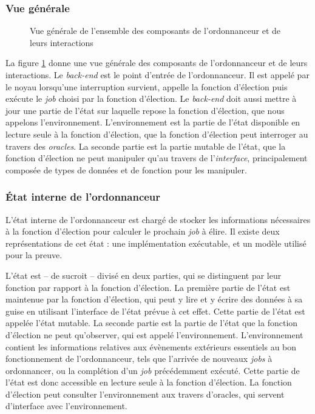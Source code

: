			\subsubsection{Vue générale}
			\begin{figure}[!ht]
			    \centering
			    
			    \caption{Vue générale de l'ensemble des composants de l'ordonnanceur et de leurs interactions}
			    \label{fig:project_overview}
			\end{figure}


			La figure \ref{fig:project_overview} donne une vue générale des composants de l'ordonnanceur et de leurs interactions. Le \emph{back-end} est le point d'entrée de l'ordonnanceur. Il est appelé par le noyau lorsqu'une interruption survient, appelle la fonction d'élection puis exécute le \emph{job} choisi par la fonction d'élection. Le \emph{back-end} doit aussi mettre à jour une partie de l'état sur laquelle repose la fonction d'élection, que nous appelons l'environnement. L'environnement est la partie de l'état disponible en lecture seule à la fonction d'élection, que la fonction d'élection peut interroger au travers des \emph{oracles}. La seconde partie est la partie mutable de l'état, que la fonction d'élection ne peut manipuler qu'au travers de l'\emph{interface}, principalement composée de types de données et de fonction pour les manipuler.

		\subsubsection{État interne de l'ordonnanceur}

			L'état interne de l'ordonnanceur est chargé de stocker les informations nécessaires à la fonction d'élection pour calculer le prochain \emph{job} à élire. Il existe deux représentations de cet état : une implémentation exécutable, et un modèle utilisé pour la preuve.

			L'état est -- de sucroit -- divisé en deux parties, qui se distinguent par leur fonction par rapport à la fonction d'élection. La première partie de l'état est maintenue par la fonction d'élection, qui peut y lire et y écrire des données à sa guise en utilisant l'interface de l'état prévue à cet effet. Cette partie de l'état est appelée l'état mutable. La seconde partie est la partie de l'état que la fonction d'élection ne peut qu'observer, qui est appelé l'environnement. L'environnement contient les informations relatives aux évènements extérieurs essentiels au bon fonctionnement de l'ordonnanceur, tels que l'arrivée de nouveaux \emph{jobs} à ordonnancer, ou la complétion d'un \emph{job} précédemment exécuté. Cette partie de l'état est donc accessible en lecture seule à la fonction d'élection. La fonction d'élection peut consulter l'environnement aux travers d'oracles, qui servent d'interface avec l'environnement.

